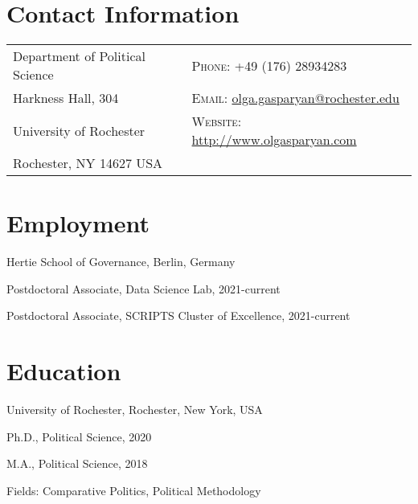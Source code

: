 \documentclass[margin,line,12pt]{res}
\newenvironment{list1}{
  \begin{list}{\ding{113}}{%
      \setlength{\itemsep}{0in}
      \setlength{\parsep}{0in} \setlength{\parskip}{0in}
      \setlength{\topsep}{0in} \setlength{\partopsep}{0in}
      \setlength{\leftmargin}{0.17in}}}{\end{list}}
\begin{document}

\begin{resume}
\section{\sc Contact Information}
\vspace{.05in}
\begin{tabular}{@{}p{2.5in}p{4in}}
Department of Political Science                 & \textsc{Phone}: +49 (176) 28934283 \\
Harkness Hall, 304        & \textsc{Email}: \href{mailto:olga.gasparyan@rochester.edu}{olga.gasparyan@rochester.edu} \\
University of Rochester             & \textsc{Website}: \href{http://www.olgasparyan.com}{http://www.olgasparyan.com} \\
Rochester, NY  14627 USA        \\
\end{tabular}

\section{\sc Employment}
{Hertie School of Governance}, Berlin, Germany\\
\vspace*{-.1in}
\begin{list1}
	\item[] Postdoctoral Associate, Data Science Lab, 2021-current
	\item[] Postdoctoral Associate, SCRIPTS Cluster of Excellence, 2021-current

\end{list1}

\section{\sc Education}
{University of Rochester}, Rochester, New York, USA\\
\vspace*{-.1in}
\begin{list1}
\item[] Ph.D., Political Science, 2020 
\item[] M.A., Political Science, 2018 
\item[] Fields: Comparative Politics, Political Methodology 
\end{list1}


\end{resume}
\end{document}
